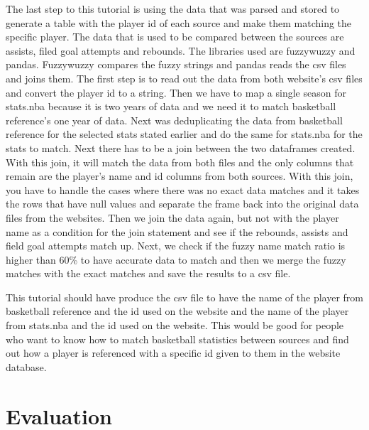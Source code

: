\documentclass[10pt,twocolumn]{article}
\begin{document}
The last step to this tutorial is using the data that was parsed and stored to generate a table with the player id of each source and make them matching the specific player. The data that is used to be compared between the sources are assists, filed goal attempts and rebounds. The libraries used are fuzzywuzzy and pandas. Fuzzywuzzy compares the fuzzy strings and pandas reads the csv files and joins them. The first step is to read out the data from both website's csv files and convert the player id to a string. Then we have to map a single season for stats.nba because it is two years of data and we need it to match basketball reference's one year of data. Next was deduplicating the data from basketball reference for the selected stats stated earlier and do the same for stats.nba for the stats to match. Next there has to be a join between the two dataframes created. With this join, it will match the data from both files and the only columns that remain are the player's name and id columns from both sources. With this join, you have to handle the cases where there was no exact data matches and it takes the rows that have null values and separate the frame back into the original data files from the websites. Then we join the data again, but not with the player name as a condition for the join statement and see if the rebounds, assists and field goal attempts match up. Next, we check if the fuzzy name match ratio is higher than 60\% to have accurate data to match and then we merge the fuzzy matches with the exact matches and save the results to a csv file. 

This tutorial should have produce the csv file to have the name of the player from basketball reference and the id used on the website and the name of the player from stats.nba and the id used on the website. This would be good for people who want to know how to match basketball statistics between sources and find out how a player is referenced with a specific id given to them in the website database.


\section{Evaluation}
\end{document}
